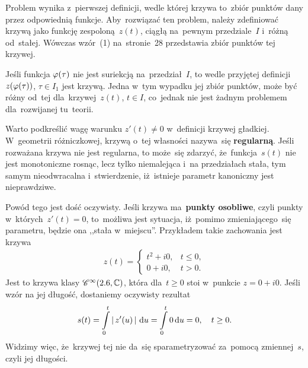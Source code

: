 \documentclass[a4paper,11pt]{article}
\begin{document}
Problem wynika z~pierwszej definicji, wedle której krzywa to~zbiór
punktów dany przez odpowiednią funkcje. Aby~rozwiązać ten problem,
należy zdefiniować krzywą jako funkcję zespoloną~$z( t )$, ciągłą
na~pewnym przedziale~$I$ i~różną od~stałej. Wówczas wzór~(1)
na~stronie~28 przedstawia zbiór punktów tej krzywej.

\vspace{\spaceFour}


\start {} Jeśli funkcja $\varphi( \tau )$ nie jest suriekcją
na~przedział~$I$, to wedle przyjętej definicji~$z( \varphi( \tau ) )$,
$\tau \in I_{ 1 }$ jest krzywą. Jedna w~tym wypadku jej zbiór punktów,
może być różny od~tej dla~krzywej~$z( t )$, $t \in I$, co~jednak nie
jest żadnym problemem dla~rozwijanej tu~teorii.

\vspace{\spaceFour}


\start {} Warto podkreślić wagę warunku $z'( t ) \neq 0$
w~definicji krzywej gładkiej. W~geometrii różniczkowej, krzywą o~tej
własności nazywa~się \textbf{regularną}. Jeśli rozważana krzywa nie
jest regularna, to może~się zdarzyć, że~funkcja~$s( t )$ nie jest
monotoniczne rosnąc, lecz tylko niemalejąca i~na przedziałach stała,
tym samym nieodwracalna i~stwierdzenie, iż~istnieje parametr
kanoniczny jest nieprawdziwe.

Powód tego jest dość oczywisty. Jeśli krzywa ma~\textbf{punkty
  osobliwe}, czyli punkty w~których~$z'( t ) = 0$, to~możliwa jest
sytuacja, iż~pomimo zmieniającego~się parametru, będzie ona ,,stała
w~miejscu''. Przykładem takie zachowania jest krzywa
\begin{equation}
  \label{eq:Leja-28}
  \begin{split}
    z( t ) =
    \begin{cases}
      t^{ 2 } + i 0, & t \leq 0, \\
      0 + i 0, & t > 0.
    \end{cases}
  \end{split}
\end{equation}
Jest to krzywa klasy $\mathcal{C}^{ \infty }( 2.6, \mathbb{C} )$, która dla~$t \geq 0$ stoi
w~punkcie $z = 0 + i 0$. Jeśli wzór na jej długość, dostaniemy
oczywisty rezultat
\begin{equation}
  \label{eq:Leja-29}
  \begin{split}
    s( t ) = \int\limits_{ 0 }^{ t } \left| \,  z'( u )  \, \right| \, \mathrm{d} u = \int\limits_{ 0 }^{
      t } 0 \, \mathrm{d} u = 0, \quad t \geq 0.
  \end{split}
\end{equation}
Widzimy więc, że~krzywej tej nie da~się sparametryzować za~pomocą
zmiennej~$s$, czyli jej długości.
\end{document}
